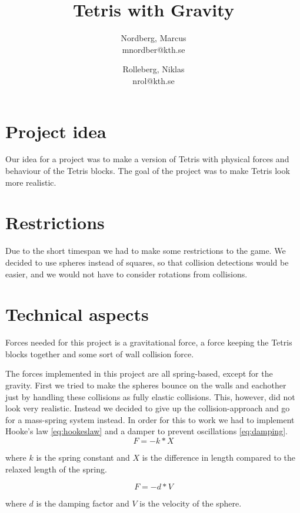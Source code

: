 \documentclass[11pt]{article} %
\title{Tetris with Gravity}
\author{Nordberg, Marcus \\ mnordber@kth.se
		\and
	Rolleberg, Niklas \\ nrol@kth.se}
\begin{document}
\maketitle

\tableofcontents

\section{Project idea}
Our idea for a project was to make a version of Tetris with physical forces and behaviour of the Tetris blocks. The goal of the project was to make Tetris look more realistic. 

\section{Restrictions}
Due to the short timespan we had to make some restrictions to the game. We decided to use spheres instead of squares, so that collision detections would be easier, and we would not have to consider rotations from collisions.

\section{Technical aspects}
Forces needed for this project is a gravitational force, a force keeping the Tetris blocks together and some sort of wall collision force.

The forces implemented in this project are all spring-based, except for the gravity. First we tried to make the spheres bounce on the walls and eachother just by handling these collisions as fully elastic collisions. This, however, did not look very realistic. Instead we decided to give up the collision-approach and go for a mass-spring system instead. In order for this to work we had to implement Hooke's law \eqref{eq:hookeslaw} and a damper to prevent oscillations \eqref{eq:damping}.
\begin{equation}
	\label{eq:hookeslaw}
       F = -k*X
\end{equation}

where $k$ is the spring constant and $X$ is the difference in length compared to the relaxed length of the spring.

\begin{equation}
	\label{eq:damping}
       F = -d*V
\end{equation}

where $d$ is the damping factor and $V$ is the velocity of the sphere.
\end{document}
